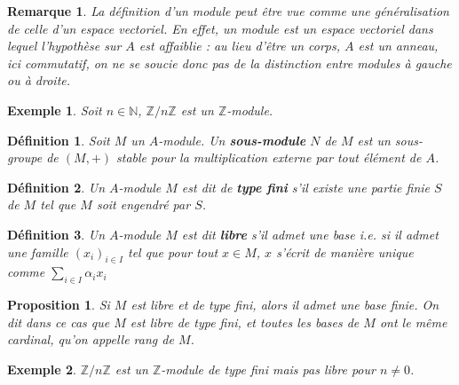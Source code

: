 \documentclass[a4paper,12pt]{report}  %
\theoremstyle{definitionstyle}
\newtheorem{definition}{Définition}[chapter] %
\theoremstyle{examplestyle}
\newtheorem{example}{Exemple}[chapter] %
\theoremstyle{remarkstyle}
\newtheorem{remark}{Remarque}[chapter] %
\theoremstyle{propositionstyle}
\newtheorem{proposition}{Proposition}[chapter]  %
\theoremstyle{theoremstyle}
\theoremstyle{proofstyle}
\begin{document}
	\begin{remark}
		La définition d'un module peut être vue comme une généralisation de celle d'un espace vectoriel. En effet, un module est un espace vectoriel dans lequel l'hypothèse sur $A$ est affaiblie : au lieu d'être un corps, $A$ est un anneau, ici commutatif, on ne se soucie donc pas de la distinction entre modules à gauche ou à droite.
	\end{remark}

	
	\begin{example}
		Soit $n \in \mathbb{N}$, $\mathbb{Z}/n \mathbb{Z}$ est un $\mathbb{Z}$-module.
	\end{example}

	\begin{definition}
		Soit $M$ un $A$-module. Un \textbf{sous-module} $N$ de $M$ est un sous-groupe de $(M, +)$ stable pour la multiplication externe par tout élément de $A$.
	\end{definition}

	
	
	\begin{definition}
		Un $A$-module $M$ est dit de \textbf{type fini} s'il existe une partie finie $S$ de $M$ tel que $M$ soit engendré par $S$.
	\end{definition}

	\begin{definition}
		Un $A$-module $M$ est dit \textbf{libre} s'il admet une base i.e. si il admet une famille $(x_i)_{i \in I}$ tel que pour tout $x \in M$, $x$ s'écrit de manière unique comme $\sum_{i \in I} \alpha_i x_i$
	\end{definition}

	\begin{proposition}
		Si $M$ est libre et de type fini, alors il admet une base finie. On dit dans ce cas que $M$ est libre de type fini, et toutes les bases de $M$ ont le même cardinal, qu'on appelle rang de $M$.
	\end{proposition}

	\begin{example}
		$\mathbb{Z}/n \mathbb{Z}$ est un $\mathbb{Z}$-module de type fini mais pas libre pour $n \neq 0$.
	\end{example}
		
\end{document}
